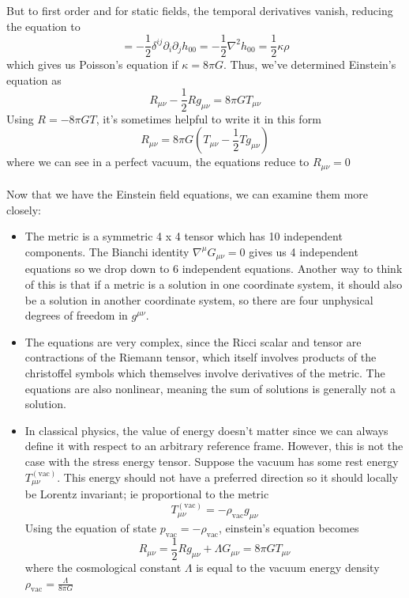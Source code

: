 \documentclass[11pt]{article}
\begin{document}
But to first order and for static fields, the temporal derivatives vanish, reducing the equation to
\[
    = -\frac{1}{2}\delta^{i j}\partial_i \partial_j h_{0 0} = -\frac{1}{2}\nabla^2 h_{0 0} = \frac{1}{2}\kappa \rho
\]
which gives us Poisson's equation if \(\kappa = 8 \pi G\). Thus, we've determined Einstein's equation as 
\[
    \boxed{R_{\mu\nu} - \frac{1}{2}R g_{\mu\nu} = 8\pi G T_{\mu\nu}}
\]
\noindent Using \(R = -8\pi G T\), it's sometimes helpful to write it in this form
\[
    R_{\mu\nu} = 8\pi G\left(T_{\mu\nu} - \frac{1}{2} T g_{\mu\nu}\right)
\]
where we can see in a perfect vacuum, the equations reduce to \(R_{\mu\nu} = 0\)
\\
\\
\noindent Now that we have the Einstein field equations, we can examine them more closely:
\begin{itemize}
    \item The metric is a symmetric 4 x 4 tensor which has 10 independent components. The Bianchi identity
    \(\nabla^\mu G_{\mu\nu} = 0\) gives us 4 independent equations so we drop down to 6 independent equations. 
    Another way to think of this is that if a metric is a solution in one coordinate system, it should also be 
    a solution in another coordinate system, so there are four unphysical degrees of freedom in \(g^{\mu\nu}\).

    \item The equations are very complex, since the Ricci scalar and tensor are contractions of the Riemann tensor,
    which itself involves products of the christoffel symbols which themselves involve derivatives of the metric. The
    equations are also nonlinear, meaning the sum of solutions is generally not a solution.

    \item In classical physics, the value of energy doesn't matter since we can always define it with respect to an arbitrary
    reference frame. However, this is not the case with the stress energy tensor. Suppose the vacuum has some rest energy \(T_{\mu\nu}^{(\text{vac})}\).
    This energy should not have a preferred direction so it should locally be Lorentz invariant; ie proportional to the metric
    \[
        T_{\mu\nu}^{(\text{vac})} = -\rho_{\text{vac}}g_{\mu\nu}
    \]
    Using the equation of state \(p_{\text{vac}} = - \rho_{\text{vac}}\), einstein's equation becomes 
    \[
        R_{\mu\nu} = \frac{1}{2}Rg_{\mu\nu} + \Lambda G_{\mu\nu} = 8\pi G T_{\mu\nu}
    \]
    where the cosmological constant \(\Lambda\) is equal to the vacuum energy density \(\rho_{\text{vac}} = \frac{\Lambda}{8\pi G}\)
    

    
\end{itemize}
\end{document}

